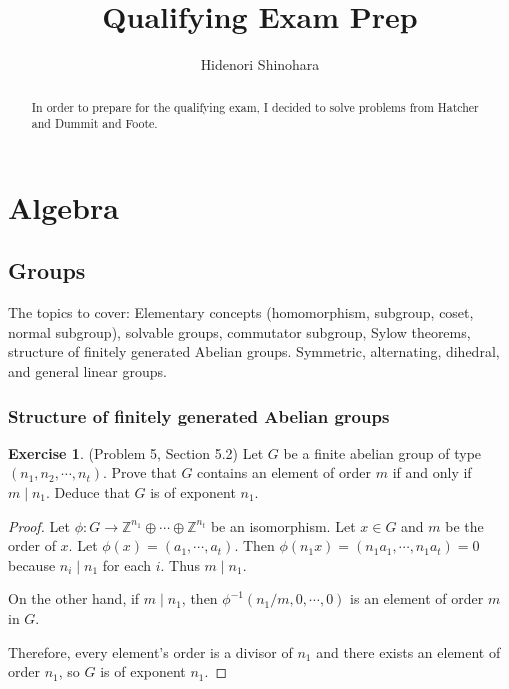 \documentclass[12pt, psamsfonts]{amsart}
\theoremstyle{definition}
\newtheorem*{exer}{Exercise}
\theoremstyle{remark}
\numberwithin{equation}{section}
\begin{document}
\title{Qualifying Exam Prep}
\author{Hidenori Shinohara}
\maketitle

\begin{abstract}
  In order to prepare for the qualifying exam, I decided to solve problems from Hatcher and Dummit and Foote.
\end{abstract}

\tableofcontents

\section{Algebra}

\subsection{Groups}
The topics to cover: Elementary concepts (homomorphism, subgroup, coset, normal subgroup), solvable groups, commutator subgroup, Sylow theorems, structure of finitely generated Abelian groups.
Symmetric, alternating, dihedral, and general linear groups.

\subsubsection{Structure of finitely generated Abelian groups}

\begin{exer}{(Problem 5, Section 5.2)}
  Let $G$ be a finite abelian group of type $(n_1, n_2, \cdots, n_t)$.
  Prove that $G$ contains an element of order $m$ if and only if $m \mid n_1$.
  Deduce that $G$ is of exponent $n_1$.
\end{exer}

\begin{proof}
  Let $\phi:G \rightarrow \mathbb{Z}^{n_1} \oplus \cdots \oplus \mathbb{Z}^{n_t}$ be an isomorphism.
  Let $x \in G$ and $m$ be the order of $x$.
  Let $\phi(x) = (a_1, \cdots, a_t)$.
  Then $\phi(n_1x) = (n_1a_1, \cdots, n_1a_t) = 0$ because $n_i \mid n_1$ for each $i$.
  Thus $m \mid n_1$.

  On the other hand, if $m \mid n_1$, then $\phi^{-1}(n_1 / m, 0, \cdots, 0)$ is an element of order $m$ in $G$.

  Therefore, every element's order is a divisor of $n_1$ and there exists an element of order $n_1$, so $G$ is of exponent $n_1$.
\end{proof}
\end{document}
